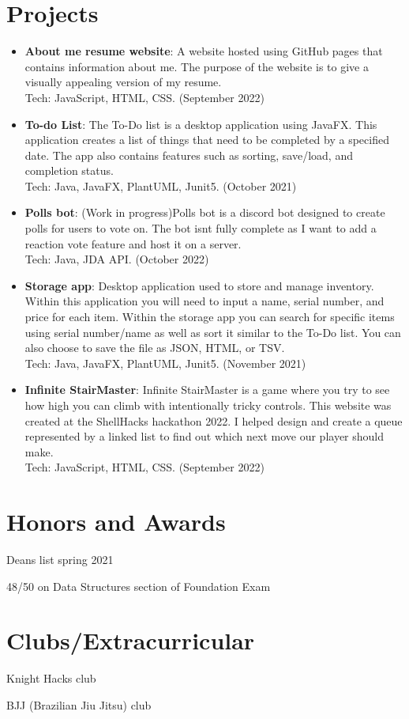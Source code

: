 \documentclass[a4paper,20pt]{article}
\newcommand{\resumeItem}[2]{
  \item\normalsize{
    \textbf{#1}{: #2 \vspace{1pt}}
  }
}
\newcommand{\resumeSubItem}[2]{\resumeItem{#1}{#2}\vspace{1pt}}
\newcommand{\resumeSubHeadingListStart}{\begin{itemize}[leftmargin=*]}
\newcommand{\resumeSubHeadingListEnd}{\end{itemize}}
\begin{document}
    
    \section{Projects}
        \resumeSubHeadingListStart
            \resumeSubItem{About me resume website}{A website hosted using GitHub pages that contains information about me. The purpose of the website is to give a visually appealing version of my resume.\\Tech: JavaScript, HTML, CSS. (September 2022)}
            \resumeSubItem{To-do List}{The To-Do list is a desktop application using JavaFX. This application creates a list of things that need to be completed by a specified date. The app also contains features such as sorting, save/load, and completion status.  \\Tech: Java, JavaFX, PlantUML, Junit5. (October 2021)}
            \resumeSubItem{Polls bot}{(Work in progress)Polls bot is a discord bot designed to create polls for users to vote on. The bot isnt fully complete as I want to add a reaction vote feature and host it on a server.\\Tech: Java, JDA API. (October 2022)}
            \resumeSubItem{Storage app}{Desktop application used to store and manage inventory. Within this application you will need to input a name, serial number, and price for each item. Within the storage app you can search for specific items using serial number/name as well as sort it similar to the To-Do list. You can also choose to save the file as JSON, HTML, or TSV.  \\Tech: Java, JavaFX, PlantUML, Junit5. (November 2021)}
            \resumeSubItem{Infinite StairMaster}{Infinite StairMaster is a game where you try to see how high you can climb with intentionally tricky controls. This website was created at the ShellHacks hackathon 2022. I helped design and create a queue represented by a linked list to find out which next move our player should make. \\Tech: JavaScript, HTML, CSS. (September 2022)}
            \vspace{2pt}
        \resumeSubHeadingListEnd
    
    
    \section{Honors and Awards}
        \begin{description}[font=$\bullet$]
            \item {Deans list spring 2021}
            \item {48/50 on Data Structures section of Foundation Exam}
        \end{description}
        
    \section{Clubs/Extracurricular}
        \begin{description}[font=$\bullet$]
            \item {Knight Hacks club}
            \item {BJJ (Brazilian Jiu Jitsu) club}
        \end{description}
        
\end{document}
